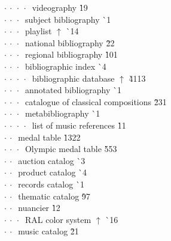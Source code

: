 \begin{tabbing}
$\cdot\:\cdot\:\cdot\:\cdot\:$  videography  \` 19\\
$\cdot\:\cdot\:\cdot\:$  subject bibliography  \` {\raisebox{.4\height}{\scalebox{.6}{+}}}1\\
$\cdot\:\cdot\:\cdot\:$  playlist $\uparrow$ \` {\raisebox{.4\height}{\scalebox{.6}{+}}}14\\
$\cdot\:\cdot\:\cdot\:$  national bibliography  \` 2{\raisebox{.4\height}{\scalebox{.6}{+}}}2\\
$\cdot\:\cdot\:\cdot\:$  regional bibliography  \` 10{\raisebox{.4\height}{\scalebox{.6}{+}}}1\\
$\cdot\:\cdot\:\cdot\:$  bibliographic index  \` {\raisebox{.4\height}{\scalebox{.6}{+}}}4\\
$\cdot\:\cdot\:\cdot\:\cdot\:$  bibliographic database $\uparrow$ \` 41{\raisebox{.4\height}{\scalebox{.6}{+}}}13\\
$\cdot\:\cdot\:\cdot\:$  annotated bibliography  \` {\raisebox{.4\height}{\scalebox{.6}{+}}}1\\
$\cdot\:\cdot\:\cdot\:$  catalogue of classical compositions  \` 23{\raisebox{.4\height}{\scalebox{.6}{+}}}1\\
$\cdot\:\cdot\:\cdot\:$  metabibliography  \` {\raisebox{.4\height}{\scalebox{.6}{+}}}1\\
$\cdot\:\cdot\:\cdot\:\cdot\:$  list of music references  \` 1{\raisebox{.4\height}{\scalebox{.6}{+}}}1\\
$\cdot\:\cdot\:$  medal table  \` 132{\raisebox{.4\height}{\scalebox{.6}{+}}}2\\
$\cdot\:\cdot\:\cdot\:$  Olympic medal table  \` 55{\raisebox{.4\height}{\scalebox{.6}{+}}}3\\
$\cdot\:\cdot\:$  auction catalog  \` {\raisebox{.4\height}{\scalebox{.6}{+}}}3\\
$\cdot\:\cdot\:$  product catalog  \` {\raisebox{.4\height}{\scalebox{.6}{+}}}4\\
$\cdot\:\cdot\:$  records catalog  \` {\raisebox{.4\height}{\scalebox{.6}{+}}}1\\
$\cdot\:\cdot\:$  thematic catalog  \` 9{\raisebox{.4\height}{\scalebox{.6}{+}}}7\\
$\cdot\:\cdot\:$  nuancier  \` 1{\raisebox{.4\height}{\scalebox{.6}{+}}}2\\
$\cdot\:\cdot\:\cdot\:$  RAL color system $\uparrow$ \` {\raisebox{.4\height}{\scalebox{.6}{+}}}16\\
$\cdot\:\cdot\:$  music catalog  \` 2{\raisebox{.4\height}{\scalebox{.6}{+}}}1\\

\end{tabbing}
